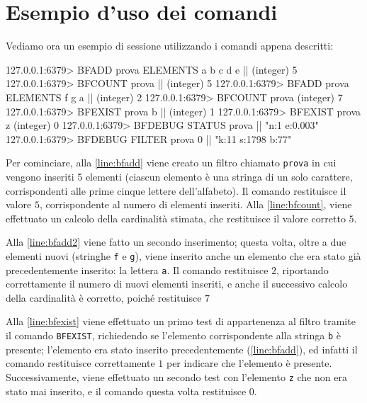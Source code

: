 \section{Esempio d'uso dei comandi}

Vediamo ora un esempio di sessione utilizzando i comandi appena descritti:

\medskip
\begin{redis}[numbers=left,caption=Esempio di utilizzo dei nuovi comandi per i filtri di Bloom]
127.0.0.1:6379> BFADD prova ELEMENTS a b c d e |\label{line:bfadd}|
(integer) 5
127.0.0.1:6379> BFCOUNT prova |\label{line:bfcount}|
(integer) 5
127.0.0.1:6379> BFADD prova ELEMENTS f g a |\label{line:bfadd2}|
(integer) 2
127.0.0.1:6379> BFCOUNT prova
(integer) 7
127.0.0.1:6379> BFEXIST prova b |\label{line:bfexist}|
(integer) 1
127.0.0.1:6379> BFEXIST prova z
(integer) 0
127.0.0.1:6379> BFDEBUG STATUS prova |\label{line:bfdebugstatus}|
"n:1 e:0.003"
127.0.0.1:6379> BFDEBUG FILTER prova 0 |\label{line:bfdebugfilter}|
"k:11 s:1798 b:77"
\end{redis}

Per cominciare, alla \autoref{line:bfadd} viene creato un filtro chiamato \verb|prova| in cui
vengono inseriti 5 elementi (ciascun elemento è una stringa di un solo carattere, corrispondenti
alle prime cinque lettere dell'alfabeto). Il comando restituisce il valore $5$, corrispondente al
numero di elementi inseriti. Alla \autoref{line:bfcount}, viene effettuato un calcolo della 
cardinalità stimata, che restituisce il valore corretto $5$.

Alla \autoref{line:bfadd2} viene fatto un secondo inserimento; questa volta, oltre a due
elementi nuovi (stringhe \verb|f| e \verb|g|), viene inserito anche un elemento che era stato
già precedentemente inserito: la lettera \verb|a|. Il comando restituisce $2$, riportando
correttamente il numero di nuovi elementi inseriti, e anche il successivo calcolo della
cardinalità è corretto, poiché restituisce $7$

Alla \autoref{line:bfexist} viene effettuato un primo test di appartenenza al filtro tramite
il comando \verb|BFEXIST|, richiedendo
se l'elemento corrispondente alla stringa \verb|b| è presente; l'elemento era stato inserito
precedentemente (\autoref{line:bfadd}), ed infatti il comando restituisce correttamente $1$ per
indicare che l'elemento è presente. Successivamente, viene effettuato un secondo test con
l'elemento \verb|z| che non era stato mai inserito, e il comando questa volta restituisce $0$.

